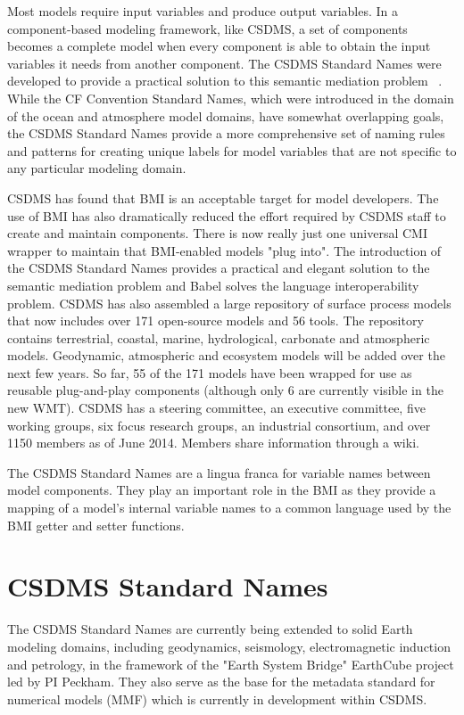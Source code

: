 \documentclass[11pt, oneside]{amsart}
\begin{document}
Most models require input variables and produce output variables. In a
component-based modeling framework, like CSDMS, a set of components becomes a
complete model when every component is able to obtain the input variables it
needs from another component. The CSDMS Standard Names were developed to
provide a practical solution to this semantic mediation problem
~\cite{peckham2012component, syvitski2014plug}.
While the CF Convention Standard Names, which were
introduced in the domain of the ocean and atmosphere model domains, have
somewhat overlapping goals, the CSDMS Standard Names provide a more
comprehensive set of naming rules and patterns for creating unique labels for
model variables that are not specific to any particular modeling domain.

CSDMS has found that BMI is an acceptable target for model developers. The use
of BMI has also dramatically reduced the effort required by CSDMS staff to
create and maintain components. There is now really just one universal CMI
wrapper to maintain that BMI-enabled models "plug into". The introduction of the
CSDMS Standard Names provides a practical and elegant solution to the semantic
mediation problem and Babel solves the language interoperability problem.
CSDMS has also assembled a large repository of surface process models that now
includes over 171 open-source models and 56 tools. The repository contains
terrestrial, coastal, marine, hydrological, carbonate and atmospheric models.
Geodynamic, atmospheric and ecosystem models will be added over the next few
years. So far, 55 of the 171 models have been wrapped for use as reusable
plug-and-play components (although only 6 are currently visible in the new WMT).
CSDMS has a steering committee, an executive committee, five working groups, six
focus research groups, an industrial consortium, and over 1150 members as of
June 2014. Members share information through a wiki.

The CSDMS Standard Names are a lingua franca for variable names between model
components. They play an important role in the BMI as they provide a mapping of
a model's internal variable names to a common language used by the BMI getter
and setter functions.


\section{CSDMS Standard Names}

The CSDMS Standard Names are currently being extended to solid Earth modeling
domains, including geodynamics, seismology, electromagnetic induction and
petrology, in the framework of the "Earth System Bridge" EarthCube project led
by PI Peckham. They also serve as the base for the metadata standard for
numerical models (MMF) which is currently in development within CSDMS.
\end{document}
